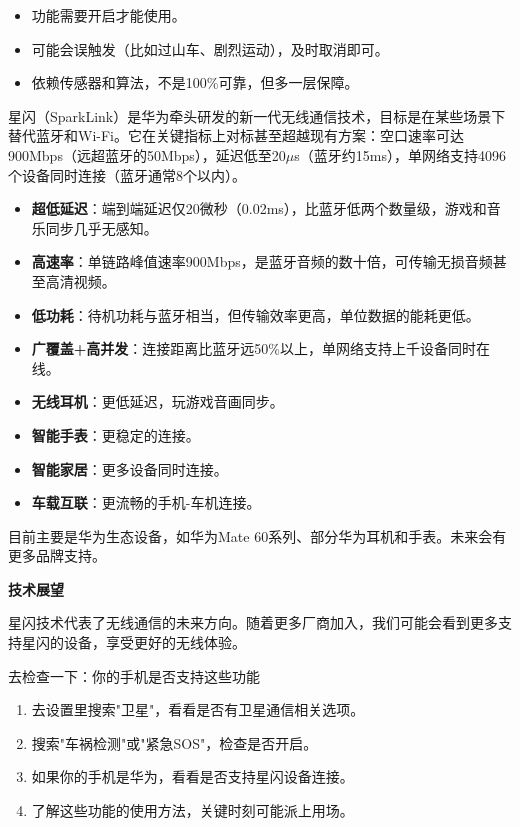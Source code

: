 \begin{itemize}
  \item 功能需要开启才能使用。
  \item 可能会误触发（比如过山车、剧烈运动），及时取消即可。
  \item 依赖传感器和算法，不是100\%可靠，但多一层保障。
\end{itemize}


星闪（SparkLink）是华为牵头研发的新一代无线通信技术，目标是在某些场景下替代蓝牙和Wi-Fi。它在关键指标上对标甚至超越现有方案：空口速率可达900Mbps（远超蓝牙的50Mbps），延迟低至20$\mu$s（蓝牙约15ms），单网络支持4096个设备同时连接（蓝牙通常8个以内）。


\begin{itemize}
  \item \textbf{超低延迟}：端到端延迟仅20微秒（0.02ms），比蓝牙低两个数量级，游戏和音乐同步几乎无感知。
  \item \textbf{高速率}：单链路峰值速率900Mbps，是蓝牙音频的数十倍，可传输无损音频甚至高清视频。
  \item \textbf{低功耗}：待机功耗与蓝牙相当，但传输效率更高，单位数据的能耗更低。
  \item \textbf{广覆盖+高并发}：连接距离比蓝牙远50\%以上，单网络支持上千设备同时在线。
\end{itemize}


\begin{itemize}
  \item \textbf{无线耳机}：更低延迟，玩游戏音画同步。
  \item \textbf{智能手表}：更稳定的连接。
  \item \textbf{智能家居}：更多设备同时连接。
  \item \textbf{车载互联}：更流畅的手机-车机连接。
\end{itemize}


目前主要是华为生态设备，如华为Mate 60系列、部分华为耳机和手表。未来会有更多品牌支持。

\textbf{技术展望}\par

星闪技术代表了无线通信的未来方向。随着更多厂商加入，我们可能会看到更多支持星闪的设备，享受更好的无线体验。

\begin{tcbpractice}{去检查一下：你的手机是否支持这些功能}
\begin{enumerate}
  \item 去设置里搜索"卫星"，看看是否有卫星通信相关选项。
  \item 搜索"车祸检测"或"紧急SOS"，检查是否开启。
  \item 如果你的手机是华为，看看是否支持星闪设备连接。
  \item 了解这些功能的使用方法，关键时刻可能派上用场。
\end{enumerate}

\end{tcbpractice}
